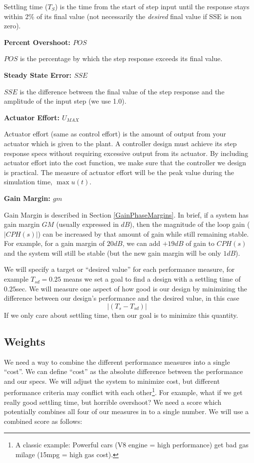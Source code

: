 Settling time ($T_S$) is the time from the start of step input until the response stays within 2\% of its final value
(not necessarily the {\it desired} final value if SSE is non zero).	%

{\bf Percent Overshoot: $POS$}

$POS$ is the percentage by which the step response exceeds its final value.


{\bf Steady State Error: $SSE$}

$SSE$ is the difference between the final value of the step response and the amplitude of the input step (we use 1.0).

{\bf Actuator Effort: $U_{MAX}$}

Actuator effort (same as control effort) is the amount of output from your actuator which is given to the plant.  A controller design must achieve its step response specs without requiring excessive output from its actuator.   By including actuator effort into the cost function, we make sure that the controller we design is practical.   The measure of actuator effort will be the peak value during the simulation time, $\max{u(t)}$.

{\bf Gain Margin: $gm$}

Gain Margin is described in Section \ref{GainPhaseMargins}.   In brief, if a system has gain margin $GM$ (usually expressed in $dB$), then the magnitude of the loop gain ($|CPH(s)|$) can be increased by that amount of gain while still remaining stable.  For example, for a gain margin of $20dB$, we can add $+19dB$ of gain to $CPH(s)$ and the system will still be stable (but the new gain margin will be only $1dB$).

We will specify a target or ``desired value'' for each performance measure, for example $T_{sd} = 0.25$ means we set a goal to find a
design with a settling time of $0.25$sec.  We will measure one aspect of how good is our design by minimizing the difference between
our design's performance and the desired value, in this case
\[
|(T_s - T_{sd})|
\]
If we only care about settling time, then our goal is to minimize this quantity.


\subsection{Weights}

We need a  way to combine the different performance measures into a single ``cost''.  We can define ``cost'' as the absolute difference between the performance and
our specs. We will adjust the system to minimize cost, but different performance criteria may conflict with each other\footnote{A classic example: Powerful cars (V8 engine = high performance) get bad gas milage (15mpg = high gas cost).}.
For example, what if we get really good settling time, but horrible overshoot?  We need a score which potentially combines all four of our measures in to a single number.   We will use a combined score as follows:	%

